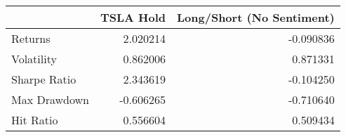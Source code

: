 \begin{tabular}{lrr}
\toprule
{} &  TSLA Hold &  Long/Short (No Sentiment) \\
\midrule
Returns      &   2.020214 &                  -0.090836 \\
Volatility   &   0.862006 &                   0.871331 \\
Sharpe Ratio &   2.343619 &                  -0.104250 \\
Max Drawdown &  -0.606265 &                  -0.710640 \\
Hit Ratio    &   0.556604 &                   0.509434 \\
\bottomrule
\end{tabular}
